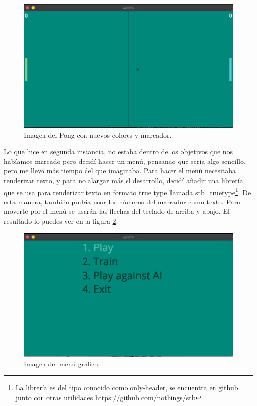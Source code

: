 \begin{figure}[H]
	\centering
	\includegraphics[width=12cm]{archivos/imagenes/pong-nuevos-colores.png}
	\caption{Imagen del Pong con nuevos colores y marcador.}
	\label{primera vista del pong plus}
\end{figure}

Lo que hice en segunda instancia, no estaba dentro de los objetivos que nos habíamos marcado pero decidí hacer un menú, pensando que sería algo sencillo, pero me llevó más tiempo del que imaginaba. Para hacer el menú necesitaba renderizar texto, y para no alargar más el desarrollo, decidí añadir una librería que se usa para renderizar texto en formato true type llamada stb\_truetype\footnote{La librería es del tipo conocido como only-header, se encuentra en github junto con otras utilidades \url{https://github.com/nothings/stb}}. De esta manera, también podría usar los números del marcador como texto. Para moverte por el menú se usarán las flechas del teclado de arriba y abajo. El resultado lo puedes ver en la figura \ref{primer menu del juego}.

\begin{figure}[H]
	\centering
	\includegraphics[width=12cm]{archivos/imagenes/menu-grafico-integrado-en-el-juego.png}
	\caption{Imagen del menú gráfico.}
	\label{primer menu del juego}
\end{figure}

